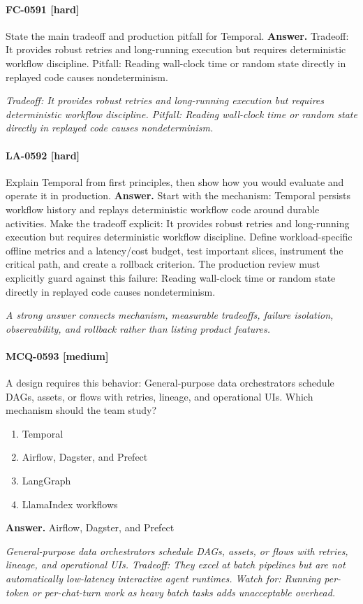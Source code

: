\paragraph{FC-0591 [hard]} State the main tradeoff and production pitfall for Temporal.
\noindent\textbf{Answer.} Tradeoff: It provides robust retries and long-running execution but requires deterministic workflow discipline. Pitfall: Reading wall-clock time or random state directly in replayed code causes nondeterminism.
\par\textit{Tradeoff: It provides robust retries and long-running execution but requires deterministic workflow discipline. Pitfall: Reading wall-clock time or random state directly in replayed code causes nondeterminism.}
\paragraph{LA-0592 [hard]} Explain Temporal from first principles, then show how you would evaluate and operate it in production.
\noindent\textbf{Answer.} Start with the mechanism: Temporal persists workflow history and replays deterministic workflow code around durable activities. Make the tradeoff explicit: It provides robust retries and long-running execution but requires deterministic workflow discipline. Define workload-specific offline metrics and a latency/cost budget, test important slices, instrument the critical path, and create a rollback criterion. The production review must explicitly guard against this failure: Reading wall-clock time or random state directly in replayed code causes nondeterminism.
\par\textit{A strong answer connects mechanism, measurable tradeoffs, failure isolation, observability, and rollback rather than listing product features.}
\paragraph{MCQ-0593 [medium]} A design requires this behavior: General-purpose data orchestrators schedule DAGs, assets, or flows with retries, lineage, and operational UIs. Which mechanism should the team study?
\begin{enumerate}[label=\Alph*.]
\item Temporal
\item Airflow, Dagster, and Prefect
\item LangGraph
\item LlamaIndex workflows
\end{enumerate}
\noindent\textbf{Answer.} Airflow, Dagster, and Prefect
\par\textit{General-purpose data orchestrators schedule DAGs, assets, or flows with retries, lineage, and operational UIs. Tradeoff: They excel at batch pipelines but are not automatically low-latency interactive agent runtimes. Watch for: Running per-token or per-chat-turn work as heavy batch tasks adds unacceptable overhead.}
